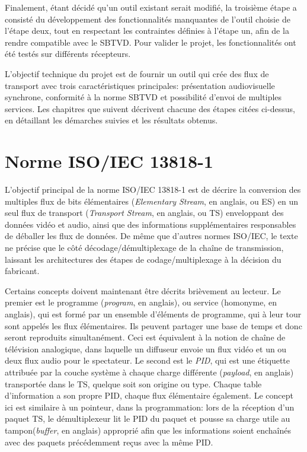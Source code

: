 \documentclass[12pt,a4paper]{article}
\begin{document}
Finalement, étant décidé qu'un outil existant serait modifié, la troisième étape a consisté du développement des fonctionnalités manquantes de l'outil choisie de l'étape deux, tout en respectant les contraintes définies à l'étape un, afin de la rendre compatible avec le SBTVD. Pour valider le projet, les fonctionnalités ont été testés sur différents récepteurs.

L'objectif technique du projet est de fournir un outil qui crée des flux de transport avec trois caractéristiques principales: présentation audiovisuelle synchrone, conformité à la norme SBTVD et possibilité d'envoi de multiples services. Les chapitres que suivent décrivent chacune des étapes citées ci-dessus, en détaillant les démarches suivies et les résultats obtenus.

\section{Norme ISO/IEC 13818-1}
\label{iso13818}

L'objectif principal de la norme ISO/IEC 13818-1 est de décrire la conversion des multiples flux de bits élémentaires (\textit{Elementary Stream}, en anglais, ou ES) en un seul flux de transport (\textit{Transport Stream}, en anglais, ou TS) enveloppant des données vidéo et audio, ainsi que des informations supplémentaires responsables de déballer les flux de données. De même que d'autres normes ISO/IEC, le texte ne précise que le côté décodage/démultiplexage de la chaîne de transmission, laissant les architectures des étapes de codage/multiplexage à la décision du fabricant.

Certains concepts doivent maintenant être décrits brièvement au lecteur. Le premier est le programme (\textit{program}, en anglais), ou service (homonyme, en anglais), qui est formé par un ensemble d'éléments de programme, qui à leur tour sont appelés les flux élémentaires. Ils peuvent partager une base de temps et donc seront reproduits simultanément. Ceci est équivalent à la notion de chaîne de télévision analogique, dans laquelle un diffuseur envoie un flux vidéo et un ou deux flux audio pour le spectateur. Le second est le \textit{PID}, qui est une étiquette attribuée par la couche système à chaque charge différente (\textit{payload}, en anglais) transportée dans le TS, quelque soit son origine ou type. Chaque table d'information a son propre PID, chaque flux élémentaire également. Le concept ici est similaire à un pointeur, dans la programmation: lors de la réception d'un paquet TS, le démultiplexeur lit le PID du paquet et pousse sa charge utile au tampon(\textit{buffer}, en anglais) approprié afin que les informations soient enchaînés avec des paquets précédemment reçus avec la même PID.
\end{document}
